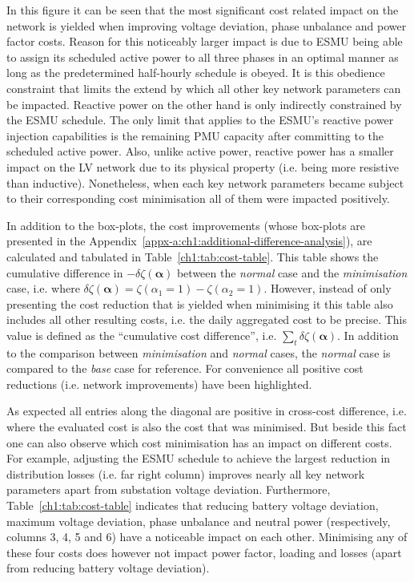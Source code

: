 In this figure it can be seen that the most significant cost related impact on the network is yielded when improving voltage deviation, phase unbalance and power factor costs.
Reason for this noticeably larger impact is due to ESMU being able to assign its scheduled active power to all three phases in an optimal manner as long as the predetermined half-hourly schedule is obeyed.
It is this obedience constraint that limits the extend by which all other key network parameters can be impacted.
Reactive power on the other hand is only indirectly constrained by the ESMU schedule.
The only limit that applies to the ESMU's reactive power injection capabilities is the remaining PMU capacity after committing to the scheduled active power.
Also, unlike active power, reactive power has a smaller impact on the LV network due to its physical property (i.e. being more resistive than inductive).
Nonetheless, when each key network parameters became subject to their corresponding cost minimisation all of them were impacted positively.

In addition to the box-plots, the cost improvements (whose box-plots are presented in the Appendix~\ref{appx-a:ch1:additional-difference-analysis}), are calculated and tabulated in Table~\ref{ch1:tab:cost-table}.
This table shows the cumulative difference in $-\delta\zeta(\boldsymbol{\alpha})$ between the \textit{normal} case and the \textit{minimisation} case, i.e. where $\delta\zeta(\boldsymbol{\alpha}) = \zeta(\alpha_1 = 1) - \zeta(\alpha_2 = 1)$.
However, instead of only presenting the cost reduction that is yielded when minimising it this table also includes all other resulting costs, i.e. the daily aggregated cost to be precise.
This value is defined as the ``cumulative cost difference'', i.e. $\sum_t \delta\zeta(\boldsymbol{\alpha})$.
In addition to the comparison between \textit{minimisation} and \textit{normal} cases, the \textit{normal} case is compared to the \textit{base} case for reference.
For convenience all positive cost reductions (i.e. network improvements) have been highlighted.



As expected all entries along the diagonal are positive in cross-cost difference, i.e. where the evaluated cost is also the cost that was minimised.
But beside this fact one can also observe which cost minimisation has an impact on different costs.
For example, adjusting the ESMU schedule to achieve the largest reduction in distribution losses (i.e. far right column) improves nearly all key network parameters apart from substation voltage deviation.
Furthermore, Table~\ref{ch1:tab:cost-table} indicates that reducing battery voltage deviation, maximum voltage deviation, phase unbalance and neutral power (respectively, columns 3, 4, 5 and 6) have a noticeable impact on each other.
Minimising any of these four costs does however not impact power factor, loading and losses (apart from reducing battery voltage deviation).

